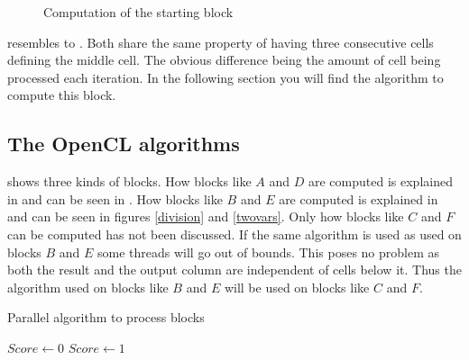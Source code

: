 \begin{figure}
    \centering
    
    \caption{Computation of the starting block} \label{start}
\end{figure}

 resembles to .
Both share the same property of having three consecutive cells defining the middle cell.
The obvious difference being the amount of cell being processed each iteration.
In the following section you will find the algorithm to compute this block.

\subsection{The OpenCL algorithms} \label{algorithms}
 shows three kinds of blocks.
How blocks like $A$ and $D$ are computed is explained in  and can be seen in .
How blocks like $B$ and $E$ are computed is explained in  and can be seen in figures \ref{division} and \ref{twovars}.
Only how blocks like $C$ and $F$ can be computed has not been discussed.
If the same algorithm is used as used on blocks $B$ and $E$ some threads will go out of bounds.
This poses no problem as both the result and the output column are independent of cells below it.
Thus the algorithm used on blocks like $B$ and $E$ will be used on blocks like $C$ and $F$.

\begin{algorithm}[p]
\caption{Parallel algorithm to process blocks} \label{block}
\begin{algorithmic}[1]
    \Statex
        \Statex
            \State $Score \gets 0$
        \Else
            \State $Score \gets 1$
        \EndIf
        \Statex
        \Statex
        \Statex
    \EndFor
\EndProcedure
\end{algorithmic}
\end{algorithm}

